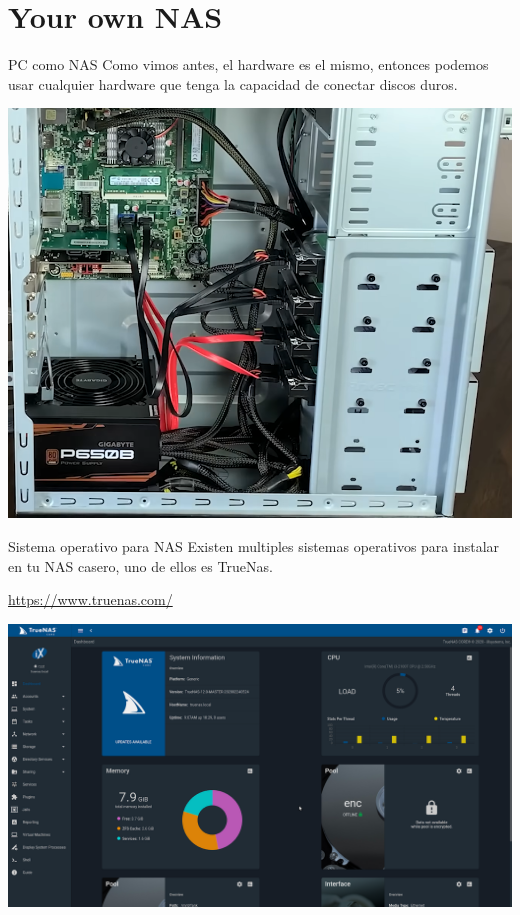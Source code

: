 \documentclass[presentation]{beamer}
\begin{document}
\section{Your own NAS}
\label{sec:org256c20a}
\begin{frame}[label={sec:org8578c68}]{PC como NAS}
Como vimos antes, el hardware es el mismo, entonces podemos usar cualquier hardware que tenga la capacidad de conectar discos duros.
\begin{center}
\includegraphics[width=.9\linewidth]{./imagenes/PC.png}
\end{center}
\end{frame}

\begin{frame}[label={sec:orgc112214}]{Sistema operativo para NAS}
Existen multiples sistemas operativos para instalar en tu NAS casero, uno de ellos es TrueNas.

\url{https://www.truenas.com/}
\begin{center}
\includegraphics[width=.9\linewidth]{./imagenes/TrueNASSO.png}
\end{center}
\end{frame}
\end{document}
